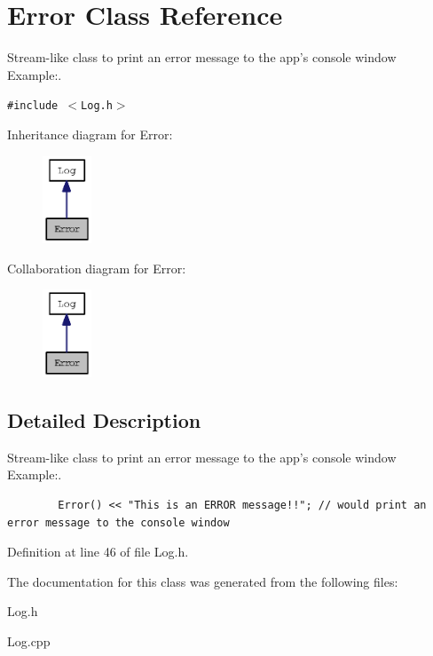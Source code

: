 \section{Error Class Reference}
\label{classError}
Stream-like class to print an error message to the app's console window Example:.  


{\tt \#include $<$Log.h$>$}

Inheritance diagram for Error:\nopagebreak
\begin{figure}[H]
\begin{center}
\leavevmode
\includegraphics[width=41pt]{classError__inherit__graph}
\end{center}
\end{figure}
Collaboration diagram for Error:\nopagebreak
\begin{figure}[H]
\begin{center}
\leavevmode
\includegraphics[width=41pt]{classError__coll__graph}
\end{center}
\end{figure}


\subsection{Detailed Description}
Stream-like class to print an error message to the app's console window Example:. 



\begin{Code}\begin{verbatim}        Error() << "This is an ERROR message!!"; // would print an error message to the console window
\end{verbatim}
\end{Code}

 

Definition at line 46 of file Log.h.

The documentation for this class was generated from the following files:\begin{CompactItemize}
\item 
Log.h\item 
Log.cpp\end{CompactItemize}

